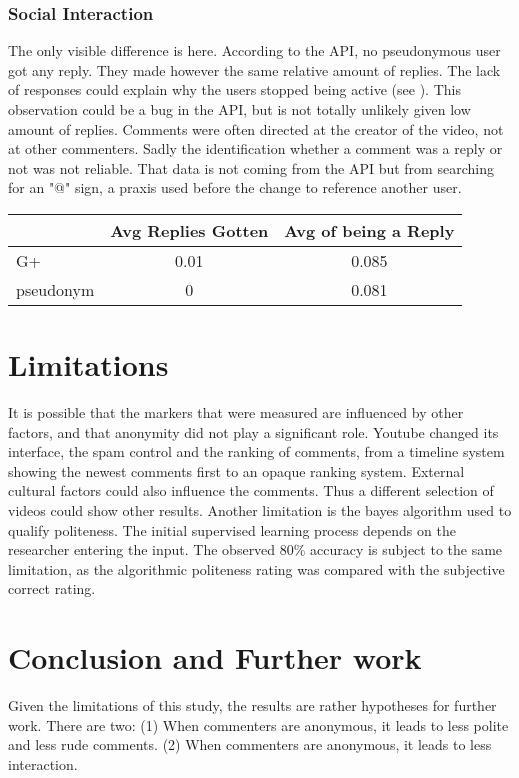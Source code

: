 \documentclass{chi-ext2}
\begin{document}
\subsubsection{Social Interaction}
The only visible difference is here. According to the API, no pseudonymous user got any reply. They made however the same relative amount of replies. The lack of responses could explain why the users stopped being active (see \cite{feedbackWiki}). This observation could be a bug in the API, but is not totally unlikely given low amount of replies. Comments were often directed at the creator of the video, not at other commenters. Sadly the identification whether a comment was a reply or not was not reliable. That data is not coming from the API but from searching for an "@" sign, a praxis used before the change to reference another user.

\begin{center}
\begin{tabular}{| l | c | c | }
    \hline
     & Avg Replies Gotten & Avg of being a Reply \\
    \hline
    G+ & 0.01  & 0.085 \\
    pseudonym & 0 & 0.081 \\
 \hline
\end{tabular}
\end{center}

\section{Limitations}
It is possible that the markers that were measured are influenced by other factors, and that anonymity did not play a significant role. Youtube changed its interface, the spam control and the ranking of comments, from a timeline system showing the newest comments first to an opaque ranking system. External cultural factors could also influence the comments. Thus a different selection of videos could show other results. Another limitation is the bayes algorithm used to qualify politeness. The initial supervised learning process depends on the researcher entering the input. The observed 80\% accuracy is subject to the same limitation, as the algorithmic politeness rating was compared with the subjective correct rating.

\section{Conclusion and Further work}
Given the limitations of this study, the results are rather hypotheses for further work. There are two: (1) When commenters are anonymous, it leads to less polite and less rude comments. (2) When commenters are anonymous, it leads to less interaction.
\end{document}
